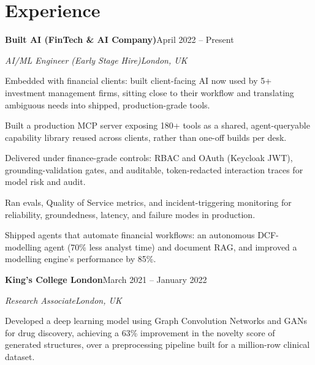 \documentclass[10pt,a4paper]{article}
\newcommand{\entry}[4]{%
  {\color{company}\bfseries #1}\hfill {\color{muted}#2}\par
  \vspace{1pt}
  {\itshape #3}\hfill {\color{muted}\itshape #4}\par
  \vspace{3pt}%
}
\begin{document}
\section{Experience}
\entry{Built AI (FinTech \& AI Company)}{April 2022 -- Present}{AI/ML Engineer (Early Stage Hire)}{London, UK}
\begin{tight}
  \item Embedded with financial clients: built client-facing AI now used by 5+ investment management firms, sitting close to their workflow and translating ambiguous needs into shipped, production-grade tools.
  \item Built a production MCP server exposing 180+ tools as a shared, agent-queryable capability library reused across clients, rather than one-off builds per desk.
  \item Delivered under finance-grade controls: RBAC and OAuth (Keycloak JWT), grounding-validation gates, and auditable, token-redacted interaction traces for model risk and audit.
  \item Ran evals, Quality of Service metrics, and incident-triggering monitoring for reliability, groundedness, latency, and failure modes in production.
  \item Shipped agents that automate financial workflows: an autonomous DCF-modelling agent (70\% less analyst time) and document RAG, and improved a modelling engine's performance by 85\%.
\end{tight}

\entry{King's College London}{March 2021 -- January 2022}{Research Associate}{London, UK}
\begin{tight}
  \item Developed a deep learning model using Graph Convolution Networks and GANs for drug discovery, achieving a 63\% improvement in the novelty score of generated structures, over a preprocessing pipeline built for a million-row clinical dataset.
\end{tight}

\end{document}
